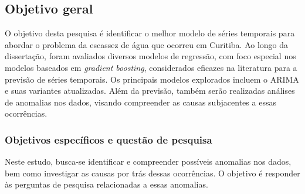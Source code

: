 \subsection{Objetivo geral} \label{subsec:objetivos}

 
O objetivo desta pesquisa é identificar o melhor modelo de séries temporais para abordar o problema da escassez de água que ocorreu em Curitiba. Ao longo da dissertação, foram avaliados diversos modelos de regressão, com foco especial nos modelos baseados em \textit{gradient boosting}, considerados eficazes na literatura para a previsão de séries temporais. Os principais modelos explorados incluem o ARIMA e suas variantes atualizadas. Além da previsão, também serão realizadas análises de anomalias nos dados, visando compreender as causas subjacentes a essas ocorrências.
    
    
    \subsubsection{Objetivos espec\'ificos e quest\~ao de pesquisa} \label{subsubsec:obespec}
    
Neste estudo, busca-se identificar e compreender possíveis anomalias nos dados, bem como investigar as causas por trás dessas ocorrências. O objetivo é responder às perguntas de pesquisa relacionadas a essas anomalias.


